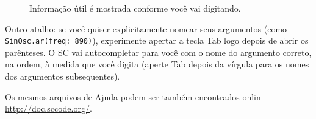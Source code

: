 \begin{figure}[h]
\centerline{}
\caption{Informação útil é mostrada conforme você vai digitando.}
\label{fig:tooltip}
\end{figure}

Outro atalho: se você quiser explicitamente nomear seus argumentos (como \texttt{SinOsc.ar(freq: 890)}), experimente apertar a tecla Tab logo depois de abrir os parênteses. O SC vai autocompletar para você com o nome do argumento correto, na ordem, à medida que você digita (aperte Tab depois da vírgula para os nomes dos argumentos subsequentes).

\bigskip
{}
\bigskip

Os mesmos arquivos de Ajuda podem ser também encontrados onlin \url{http://doc.sccode.org/}.
